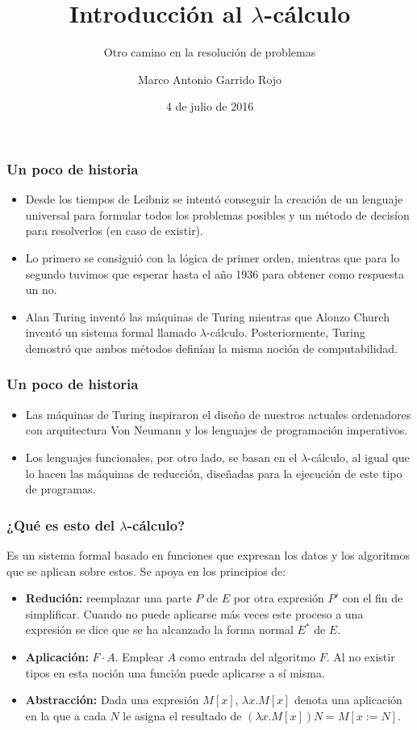 \documentclass[spanish, a4paper, 12pt, final, slideColor, nototal, colorBG, pdf, noaccumulate, darkblue] {beamer}
\title{Introducción al $\lambda$-cálculo}
\subtitle{Otro camino en la resolución de problemas}
\author{Marco Antonio Garrido Rojo}
\date{4 de julio de 2016}
\begin{document}
\maketitle
\begin{frame}
    \frametitle{Un poco de historia}
    \begin{itemize}
        \item Desde los tiempos de Leibniz se intentó conseguir la creación de un lenguaje universal para formular todos los problemas posibles y un método de decisíon para resolverlos (en caso de existir).
        \item Lo primero se consiguió con la lógica de primer orden, mientras que para lo segundo tuvimos que esperar hasta el año 1936 para obtener como respuesta un no.
        \item Alan Turing inventó las máquinas de Turing mientras que Alonzo Church inventó un sistema formal llamado $\lambda$-cálculo. Posteriormente, Turing demostró que ambos métodos definían la misma noción de computabilidad.
    \end{itemize}
\end{frame}
\begin{frame}
    \frametitle{Un poco de historia}
    \begin{itemize}
        \item Las máquinas de Turing inspiraron el diseño de nuestros actuales ordenadores con arquitectura Von Neumann y los lenguajes de programación imperativos.
        \item Los lenguajes funcionales, por otro lado, se basan en el $\lambda$-cálculo, al igual que lo hacen las máquinas de reducción, diseñadas para la ejecución de este tipo de programas.
    \end{itemize}
\end{frame}
\begin{frame}
    \frametitle{¿Qué es esto del $\lambda$-cálculo?}
    Es un sistema formal basado en funciones que expresan los datos y los algoritmos que se aplican sobre estos. Se apoya en los principios de:
    \begin{itemize}
        \item {\textbf{Redución: } reemplazar una parte $P$ de $E$ por otra expresión $P'$ con el fin de simplificar. Cuando no puede aplicarse más veces este proceso a una expresión se dice que se ha alcanzado la forma normal $E^*$ de $E$.}
        \item {\textbf{Aplicación: } $F\cdot A$. Emplear $A$ como entrada del algoritmo $F$. Al no existir tipos en esta noción una función puede aplicarse a sí misma.}
        \item {\textbf{Abstracción: } Dada una expresión $M[x]$, $\lambda x.M[x]$ denota una aplicación en la que a cada $N$ le asigna el resultado de $(\lambda x.M[x])N = M[x := N]$.} %
    \end{itemize}
\end{frame}
\end{document}
